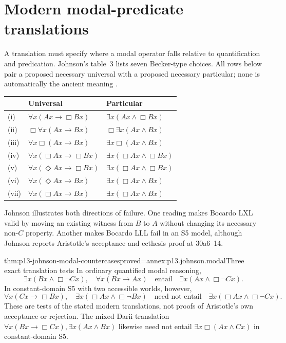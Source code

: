 \section{Modern modal-predicate translations}
\label{sec:p13-johnson-modal-translations}

A translation must specify where a modal operator falls relative to
quantification and predication. Johnson's table~3 lists seven
Becker-type choices. All rows below pair a proposed necessary universal
with a proposed necessary particular; none is automatically the ancient
meaning \parencite[pp.~260--262]{Johnson2004ModalSyllogisms}.

\begin{tabularx}{\textwidth}{@{}l X X@{}}
\toprule & Universal & Particular\\ \midrule
(i)&\(\forall x(Ax\to\Box Bx)\)&\(\exists x(Ax\land\Box Bx)\)\\
(ii)&\(\Box\forall x(Ax\to Bx)\)&\(\Box\exists x(Ax\land Bx)\)\\
(iii)&\(\forall x\Box(Ax\to Bx)\)&\(\exists x\Box(Ax\land Bx)\)\\
(iv)&\(\forall x(\Box Ax\to\Box Bx)\)&\(\exists x(\Box Ax\land\Box Bx)\)\\
(v)&\(\forall x(\Diamond Ax\to\Box Bx)\)&\(\exists x(\Box Ax\land\Box Bx)\)\\
(vi)&\(\forall x(\Diamond Ax\to Bx)\)&\(\exists x(\Box Ax\land Bx)\)\\
(vii)&\(\forall x(\Box Ax\to Bx)\)&\(\exists x(\Box Ax\land Bx)\)\\
\bottomrule
\end{tabularx}

Johnson illustrates both directions of failure. One reading makes
Bocardo LXL valid by moving an existing witness from \(B\) to \(A\)
without changing its necessary non-\(C\) property. Another makes
Bocardo LLL fail in an S5 model, although Johnson reports Aristotle's
acceptance and ecthesis proof at 30a6--14.

\begin{hbtheorem}{thm:p13-johnson-modal-countercases}{proved=annex:p13.johnson.modal}{Three exact translation tests}
In ordinary quantified modal reasoning,
\[
 \exists x(Bx\land\Box\neg Cx),\quad
 \forall x(Bx\to Ax)
 \quad\text{entail}\quad
 \exists x(Ax\land\Box\neg Cx).
\]
In constant-domain S5 with two accessible worlds, however,
\[
 \forall x(Cx\to\Box Bx),\quad
 \exists x(\Box Ax\land\Box\neg Bx)
 \quad\text{need not entail}\quad
 \exists x(\Box Ax\land\Box\neg Cx).
\]
These are tests of the stated modern translations, not proofs of
Aristotle's own acceptance or rejection.
The mixed Darii translation
\(\forall x(Bx\to\Box Cx),\exists x(Ax\land Bx)\) likewise need
not entail \(\exists x\Box(Ax\land Cx)\) in constant-domain S5.
\end{hbtheorem}

